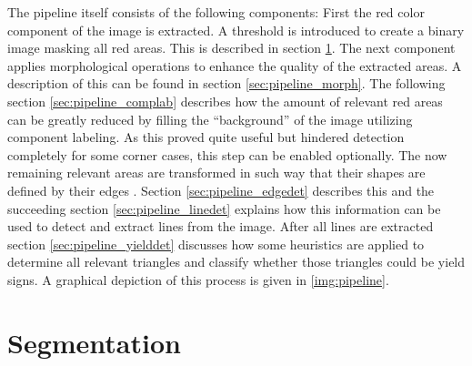 \documentclass{report}
\begin{document}
The pipeline itself consists of the following components: First the
red color component of the image is extracted. A threshold is
introduced to create a binary image masking all red areas. This is
described in section \ref{sec:pipeline_binarization}. The next
component applies morphological operations to enhance the quality of
the extracted areas. A description of this can be found in section
\ref{sec:pipeline_morph}. The following section
\ref{sec:pipeline_complab} describes how the amount of relevant red
areas can be greatly reduced by filling the ``background'' of the
image utilizing component labeling. As this proved quite useful but
hindered detection completely for some corner cases, this step can be
enabled optionally. The now remaining relevant areas are transformed
in such way that their shapes are defined by their edges
{\color{red}{(either dilation + xor or sobel)}}. Section
\ref{sec:pipeline_edgedet} describes this and the succeeding section
\ref{sec:pipeline_linedet} explains how this information can be used
to detect and extract lines from the image. After all lines are
extracted section \ref{sec:pipeline_yielddet} discusses how some
heuristics are applied to determine all relevant triangles and
classify whether those triangles could be yield signs. A graphical
depiction of this process is given in \ref{img:pipeline}.

{\color{red}{To do: Apply a median filter before or after
    segmentation?}}


\section{Segmentation}
\label{sec:pipeline_binarization}
\end{document}
